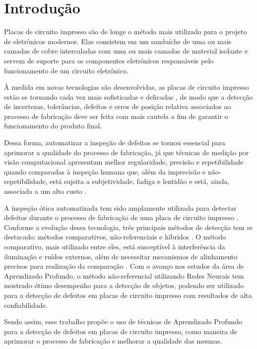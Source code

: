 \chapter{Introdução}
Placas de circuito impresso são de longe o método mais utilizado para o projeto de eletrônicos modernos. Elas consistem em um sanduíche de uma ou mais camadas de cobre intercaladas com uma ou mais camadas de material isolante \cite{ref:Zumbahlen} e servem de suporte para os componentes eletrônicos responsáveis pelo funcionamento de um circuito eletrônico.

À medida em novas tecnologias são desenvolvidas, as placas de circuito impresso estão se tornando cada vez mais sofisticadas e delicadas \cite{ref:Hu-Wang}, de modo que a detecção de incertezas, tolerâncias, defeitos e erros de posição relativa associados ao processo de fabricação \cite{ref:Leta-Feliciano-Martins} deve ser feita com mais cautela a fim de garantir o funcionamento do produto final.

Dessa forma, automatizar a inspeção de defeitos se tornou essencial para aprimorar a qualidade do processo de fabricação, já que técnicas de medição por visão computacional apresentam melhor regularidade, precisão e repetibilidade quando comparadas à inspeção humana que, além da imprecisão e não-repetibilidade, está sujeita a subjetividade, fadiga e lentidão e está, ainda, associada a um alto custo \cite{ref:Leta-Feliciano-Martins}.

A inspeção ótica automatizada tem sido amplamente utilizada para detectar defeitos durante o processo de fabricação de uma placa de circuito impresso \cite{ref:Chin-Harlow}. Conforme a evolução dessa tecnologia, três principais métodos de detecção tem se destacado: métodos comparativos, não-referenciais e híbridos \cite{ref:Wu-Wang-Liu}. O método comparativo, mais utilizado entre eles, está susceptível à interferência da iluminação e ruídos externos, além de necessitar mecanismos de alinhamento precisos para realização da comparação \cite{ref:Hu-Wang}. Com o avanço nos estudos da área de Aprendizado Profundo, o método não-referencial utilizando Redes Neurais tem mostrado ótimo desempenho para a detecção de objetos, podendo ser utilizado para a detecção de defeitos em placas de circuito impresso com resultados de alta confiabilidade.

Sendo assim, esse trabalho propõe o uso de técnicas de Aprendizado Profundo para a detecção de defeitos em placas de circuito impresso, como maneira de aprimorar o processo de fabricação e melhorar a qualidade das mesmas.

